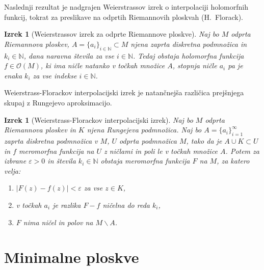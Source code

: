 \documentclass[12pt,a4paper,twoside]{article}
\theoremstyle{definition} %
\theoremstyle{plain} %
\newtheorem{izrek}[definicija]{Izrek}
\numberwithin{equation}{section}  %
\newcommand{\N}{\mathbb N}
\begin{document}
Naslednji rezultat je nadgrajen Weierstrassov izrek o interpolaciji holomorfnih funkcij, tokrat za preslikave na odprtih Riemannovih ploskvah (H.~Florack).

\begin{izrek} [Weierstrassov izrek za odprte Riemannove ploskve] \label{izr:Weierstrass}
Naj bo $M$ odprta Riemannova ploskev, $A = \{a_{i}\}_{i \in \N} \subset M$ njena zaprta diskretna podmnožica in $k_{i} \in \N$, dana naravna števila za vse $i \in \N$.
Tedaj obstaja holomorfna funkcija $f \in \mathcal{O}(M)$, ki ima ničle natanko v točkah množice $A$, stopnja ničle $a_{i}$ pa je enaka $k_{i}$ za vse indekse $i \in \N$.
\end{izrek}

Weierstrass-Florackov interpolacijski izrek je natančnejša različica prejšnjega skupaj z Rungejevo aproksimacijo.

\begin{izrek} [Weierstrass-Florackov interpolacijski izrek] \label{izr:Weierstrass-Florack}
Naj bo $M$ odprta Riemannova ploskev in $K$ njena Rungejeva podmnožica. Naj bo $A = \{ a_i \}_{i=1}^{\infty}$ zaprta diskretna podmnožica v $M$, $U$ odprta podmnožica $M$, tako da je $A \cup K \subset U$ in $f$ meromorfna funkcija na $U$ z ničlami in poli le v točkah množice $A$.
Potem za izbrane $\varepsilon > 0$ in števila $k_{i} \in \N$ obstaja meromorfna funkcija $F$ na $M$, za katero velja:
\begin{enumerate}
\item $|F(z) - f(z)| < \varepsilon$ za vse $z \in K$,
\item v točkah $a_i$ je razlika $F-f$ ničelna do reda $k_i$,
\item $F$ nima ničel in polov na $M \backslash A$.
\end{enumerate} 
\end{izrek}

\section{Minimalne ploskve}

\end{document}
